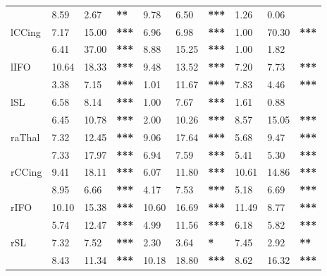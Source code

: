 \begin{tabular}{llll|llllll}
\rowcolor[HTML]{C0C0C0}
\multicolumn{1}{l|}{\cellcolor[HTML]{C0C0C0}lArc} & 8.59 & 2.67 & \textbf{**} & 9.78 & 6.50 & \multicolumn{1}{l|}{\cellcolor[HTML]{C0C0C0}\textbf{***}} & 1.26 & 0.06 & \textbf{} \\
\multicolumn{1}{l|}{lCCing} & 7.17 & 15.00 & \textbf{***} & 6.96 & 6.98 & \multicolumn{1}{l|}{\textbf{***}} & 1.00 & 70.30 & \textbf{***} \\
\rowcolor[HTML]{C0C0C0}
\multicolumn{1}{l|}{\cellcolor[HTML]{C0C0C0}lCS} & 6.41 & 37.00 & \textbf{***} & 8.88 & 15.25 & \multicolumn{1}{l|}{\cellcolor[HTML]{C0C0C0}\textbf{***}} & 1.00 & 1.82 & \textbf{} \\
\multicolumn{1}{l|}{lIFO} & 10.64 & 18.33 & \textbf{***} & 9.48 & 13.52 & \multicolumn{1}{l|}{\textbf{***}} & 7.20 & 7.73 & \textbf{***} \\
\rowcolor[HTML]{C0C0C0}
\multicolumn{1}{l|}{\cellcolor[HTML]{C0C0C0}lIL} & 3.38 & 7.15 & \textbf{***} & 1.01 & 11.67 & \multicolumn{1}{l|}{\cellcolor[HTML]{C0C0C0}\textbf{***}} & 7.83 & 4.46 & \textbf{***} \\
\multicolumn{1}{l|}{lSL} & 6.58 & 8.14 & \textbf{***} & 1.00 & 7.67 & \multicolumn{1}{l|}{\textbf{***}} & 1.61 & 0.88 & \textbf{} \\
\rowcolor[HTML]{C0C0C0}
\multicolumn{1}{l|}{\cellcolor[HTML]{C0C0C0}lUnc} & 6.45 & 10.78 & \textbf{***} & 2.00 & 10.26 & \multicolumn{1}{l|}{\cellcolor[HTML]{C0C0C0}\textbf{***}} & 8.57 & 15.05 & \textbf{***} \\
\multicolumn{1}{l|}{raThal} & 7.32 & 12.45 & \textbf{***} & 9.06 & 17.64 & \multicolumn{1}{l|}{\textbf{***}} & 5.68 & 9.47 & \textbf{***} \\
\rowcolor[HTML]{C0C0C0}
\multicolumn{1}{l|}{\cellcolor[HTML]{C0C0C0}rArc} & 7.33 & 17.97 & \textbf{***} & 6.94 & 7.59 & \multicolumn{1}{l|}{\cellcolor[HTML]{C0C0C0}\textbf{***}} & 5.41 & 5.30 & \textbf{***} \\
\multicolumn{1}{l|}{rCCing} & 9.41 & 18.11 & \textbf{***} & 6.07 & 11.80 & \multicolumn{1}{l|}{\textbf{***}} & 10.61 & 14.86 & \textbf{***} \\
\rowcolor[HTML]{C0C0C0}
\multicolumn{1}{l|}{\cellcolor[HTML]{C0C0C0}rCS} & 8.95 & 6.66 & \textbf{***} & 4.17 & 7.53 & \multicolumn{1}{l|}{\cellcolor[HTML]{C0C0C0}\textbf{***}} & 5.18 & 6.69 & \textbf{***} \\
\multicolumn{1}{l|}{rIFO} & 10.10 & 15.38 & \textbf{***} & 10.60 & 16.69 & \multicolumn{1}{l|}{\textbf{***}} & 11.49 & 8.77 & \textbf{***} \\
\rowcolor[HTML]{C0C0C0}
\multicolumn{1}{l|}{\cellcolor[HTML]{C0C0C0}rIL} & 5.74 & 12.47 & \textbf{***} & 4.99 & 11.56 & \multicolumn{1}{l|}{\cellcolor[HTML]{C0C0C0}\textbf{***}} & 6.18 & 5.82 & \textbf{***} \\
\multicolumn{1}{l|}{rSL} & 7.32 & 7.52 & \textbf{***} & 2.30 & 3.64 & \multicolumn{1}{l|}{\textbf{*}} & 7.45 & 2.92 & \textbf{**} \\
\rowcolor[HTML]{C0C0C0}
\multicolumn{1}{l|}{\cellcolor[HTML]{C0C0C0}rUnc} & 8.43 & 11.34 & \textbf{***} & 10.18 & 18.80 & \multicolumn{1}{l|}{\cellcolor[HTML]{C0C0C0}\textbf{***}} & 8.62 & 16.32 & \textbf{***}
\end{tabular}
